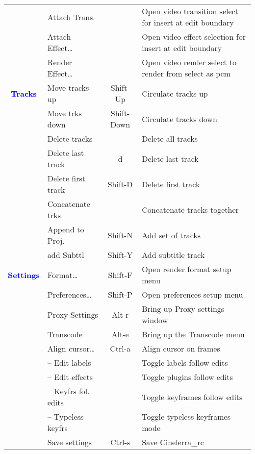 \begin{center}
\begin{longtable}{>{\bfseries}c l c p{6cm}}
             & Attach Trans. &  & Open video transition select for insert at edit boundary \\             
             & Attach Effect\dots &  & Open video effect selection for insert at edit boundary \\             
             & Render Effect\dots &  & Open video render select to render from select as pcm \\
             \midrule
          \textcolor{blue}{Tracks} & Move tracks up & Shift-Up & Circulate tracks up \\             
             & Move trks down & Shift-Down & Circulate tracks down \\             
             & Delete tracks &  & Delete all tracks \\             
             & Delete last track & d & Delete last track \\             
             & Delete first track & Shift-D & Delete first track \\             
             & Concatenate trks &  & Concatenate tracks together \\             
             & Append to Proj.	 & Shift-N & Add set of tracks \\             
             & add Subttl & Shift-Y & Add subtitle track \\             
             \midrule
          \textcolor{blue}{Settings} & Format\dots & Shift-F & Open render format setup menu \\             
             & Preferences\dots & Shift-P & Open preferences setup menu \\             
             & Proxy Settings & Alt-r & Bring up Proxy settings window \\             
             & Transcode & Alt-e & Bring up the Transcode menu \\             
             & Align cursor\dots & Ctrl-a & Align cursor on frames \\             
             & -- Edit labels &  & Toggle labels follow edits \\             
             & -- Edit effects &  & Toggle plugins follow edits \\             
             & -- Keyfrs fol. edits &  & Toggle keyframes follow edits \\             
             & -- Typeless keyfrs &  & Toggle typeless keyframes mode \\             
             & Save settings & Ctrl-s & Save Cinelerra\_rc \\             

\end{longtable}
\end{center}

